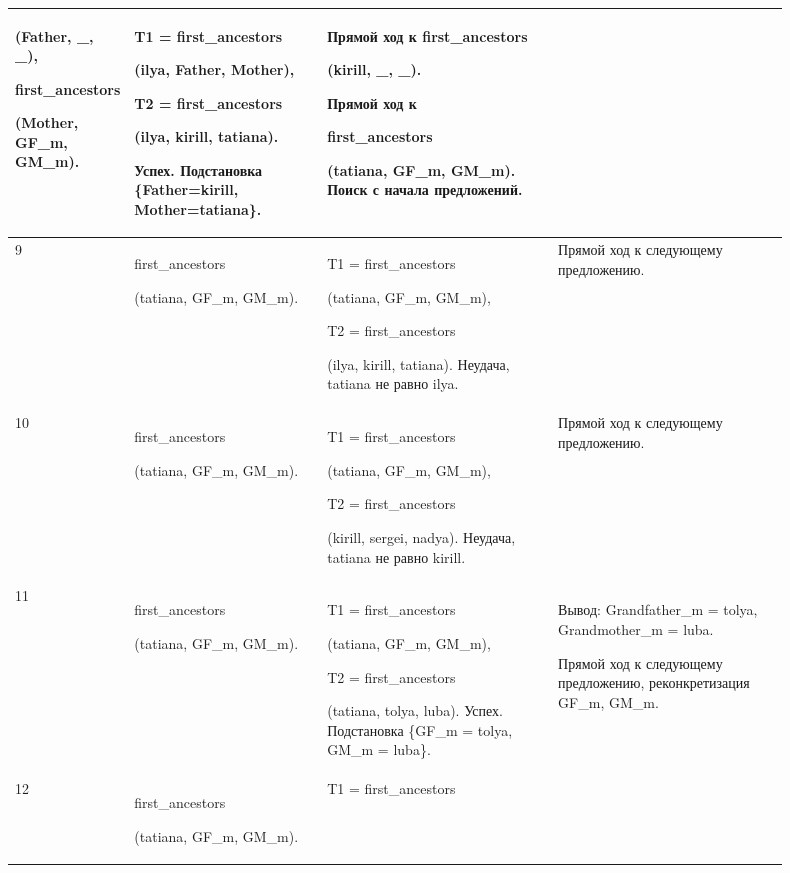 \documentclass[a4paper,12pt]{article}
\begin{document}
\begin{center}
\begin{longtable}[h!]{|p{0.05\linewidth}|p{0.25\linewidth}|p{ 0.3\linewidth}|p{ 0.3\linewidth}|}
{				(Father, \_, \_),
				
				first\_ancestors
				
				(Mother, GF\_m, GM\_m).} & {T1 = first\_ancestors
				
				(ilya, Father, Mother),
				
				T2 = first\_ancestors
				
				(ilya, kirill, tatiana).
				
				Успех. Подстановка \{Father=kirill, Mother=tatiana\}.} & {Прямой ход к first\_ancestors
				
				(kirill, \_, \_). 
				
				Прямой ход к
				
				first\_ancestors
				
				(tatiana, GF\_m, GM\_m). Поиск с начала предложений.}\\
			\hline
			{9} & {first\_ancestors
				
				(tatiana, GF\_m, GM\_m).} & {T1 = first\_ancestors
				
				(tatiana, GF\_m, GM\_m),
				
				T2 = first\_ancestors
				
				(ilya, kirill, tatiana). Неудача, tatiana не равно ilya.} & {Прямой ход к следующему предложению.}\\
			\hline
			{10} & {first\_ancestors
				
				(tatiana, GF\_m, GM\_m).} & {T1 = first\_ancestors
				
				(tatiana, GF\_m, GM\_m),
				
				T2 = first\_ancestors
				
				(kirill, sergei, nadya). Неудача, tatiana не равно kirill.} & {Прямой ход к следующему предложению.}\\
			\hline
			{11} & {first\_ancestors
				
				(tatiana, GF\_m, GM\_m).} & {T1 = first\_ancestors
				
				(tatiana, GF\_m, GM\_m),
				
				T2 = first\_ancestors
				
				(tatiana, tolya, luba). Успех. Подстановка \{GF\_m = tolya, GM\_m = luba\}.} & {Вывод: Grandfather\_m = tolya, Grandmother\_m = luba.
				
				Прямой ход к следующему предложению, реконкретизация GF\_m, GM\_m.}\\
			\hline
			{12} & {first\_ancestors
				
				(tatiana, GF\_m, GM\_m).} & {T1 = first\_ancestors
				
}
\end{longtable}
\end{center}
\end{document}
